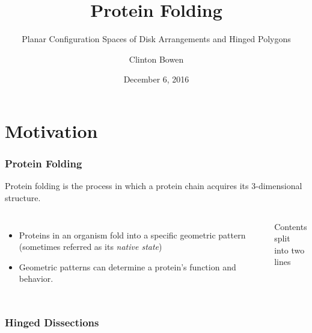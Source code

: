 \documentclass{beamer}
\title[Protein Folding]
{Protein Folding}
\subtitle{Planar Configuration Spaces of Disk Arrangements and
Hinged Polygons}
\author{Clinton Bowen}
\institute
{
  California State University Northridge
}
\date
{December 6, 2016}
\begin{document}
\frame{\titlepage}
\section{Motivation}

  \begin{frame}
    \frametitle{Protein Folding}
    Protein folding is the process in which a protein chain acquires its 3-dimensional structure.
    \begin{columns}[c] %
     \begin{itemize}
     	\item Proteins in an organism fold into a specific geometric pattern (sometimes referred as its \textit{native state})
     	\item  Geometric patterns can determine a protein's function and behavior. 
     \end{itemize}
     Contents split \\ into two lines
    \end{columns}
  \end{frame}
  \begin{frame}
    \frametitle{Hinged Dissections}
  \end{frame}
\end{document}
